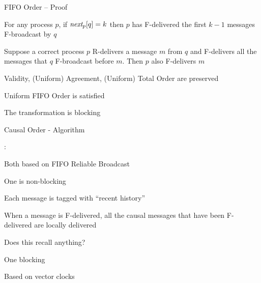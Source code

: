 \begin{frame}{FIFO Order -- Proof}

\begin{theorem}
For any process $p$, if $\textit{next}_p[q]=k$ then $p$ has F-delivered the first $k-1$ messages F-broadcast by $q$
\end{theorem}

\begin{theorem}
Suppose a correct process $p$ R-delivers a message $m$ from $q$ and F-delivers all the messages that $q$ F-broadcast before $m$. Then $p$ also F-delivers $m$
\end{theorem}

\BIL
\item \alert{Validity}, \alert{(Uniform) Agreement}, \alert{(Uniform) Total Order} are preserved
\item \alert{Uniform FIFO Order} is satisfied
\item The transformation is blocking
\EIL


\end{frame}

\begin{frame}{Causal Order - Algorithm}

:

\BIL
\item Both based on FIFO Reliable Broadcast
\item One is non-blocking
  \BI
  \item Each message is tagged with “recent history”
  \item When a message is F-delivered, all the causal messages that have been F-delivered are locally delivered
  \item Does this recall anything?
  \EI
\item One blocking 
  \BI
  \item Based on vector clocks
  \EI
\EIL
\end{frame}

